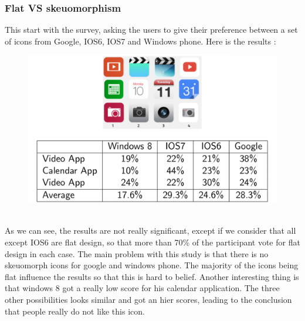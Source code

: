 \documentclass[a4paper,11pt] {article}
\theoremstyle{definition}
\begin{document}
    \subsubsection{Flat VS skeuomorphism\cite{flatVSskeuomorphisme}}
    This start with the survey, asking the users to give their preference between a set of icons from Google, IOS6, IOS7 and Windows phone. Here is the results :\\
    \begin{figure}[h]
    \centering
    \includegraphics[scale=0.3]{fig-report/flatVSskeuomorphism.png}
    \end{figure}\\
As we can see, the results are not really significant, except if we consider that all except IOS6 are flat design, so that more than 70\% of the participant vote for flat design in each case. The main problem with this study is that there is no skeuomorph icons for google and windows phone. The majority of the icons being flat influence the results so that this is hard to belief. Another interesting thing is that windows 8 got a really low score for his calendar application. The three other possibilities looks similar and got an hier scores, leading to the conclusion that people really do not like this icon.
\end{document}
